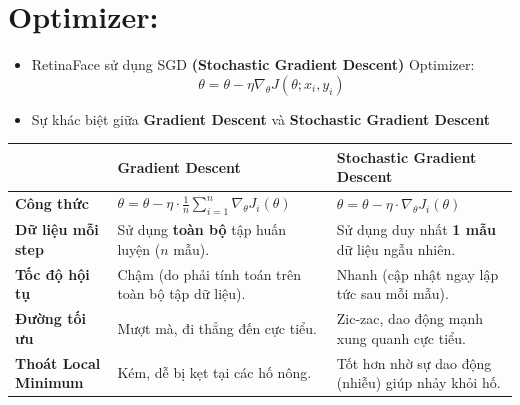 \documentclass[12pt, a4paper, oneside]{book}
\theoremstyle{plain}
\numberwithin{equation}{chapter} \DeclareMathOperator{\Var}{var}
\begin{document}
\section{Optimizer:}
\begin{itemize}
    \item[--] RetinaFace sử dụng SGD \textbf{(Stochastic Gradient Descent)} Optimizer:
    \begin{equation}
        \theta = \theta - \eta \nabla_\theta J(\theta; x_i,y_i)
    \end{equation} 
    \item[--] Sự khác biệt giữa \textbf{Gradient Descent} và \textbf{Stochastic Gradient Descent}
\end{itemize}

\begin{center}
    \renewcommand{\arraystretch}{2.5} %
    \begin{tabularx}{\textwidth}{|l|X|X|} %
        \hline
        & \centering \textbf{Gradient Descent} & \centering \textbf{Stochastic Gradient Descent} \tabularnewline
        \hline
        \textbf{Công thức} & 
        \centering $\theta = \theta - \eta \cdot \frac{1}{n} \sum_{i=1}^{n} \nabla_{\theta} J_i(\theta)$ & 
        \centering $\theta = \theta - \eta \cdot \nabla_{\theta} J_i(\theta)$ \tabularnewline
        \hline
        \textbf{Dữ liệu mỗi step} & Sử dụng \textbf{toàn bộ} tập huấn luyện ($n$ mẫu). & Sử dụng duy nhất \textbf{1 mẫu} dữ liệu ngẫu nhiên. \tabularnewline
        \hline
        \textbf{Tốc độ hội tụ} & Chậm (do phải tính toán trên toàn bộ tập dữ liệu). & Nhanh (cập nhật ngay lập tức sau mỗi mẫu). \tabularnewline
        \hline
        \textbf{Đường tối ưu} & Mượt mà, đi thẳng đến cực tiểu. & Zic-zac, dao động mạnh xung quanh cực tiểu. \tabularnewline
        \hline
        \textbf{Thoát Local Minimum} & Kém, dễ bị kẹt tại các hố nông. & Tốt hơn nhờ sự dao động (nhiễu) giúp nhảy khỏi hố. \tabularnewline
        \hline
    \end{tabularx}
\end{center}
\end{document}
